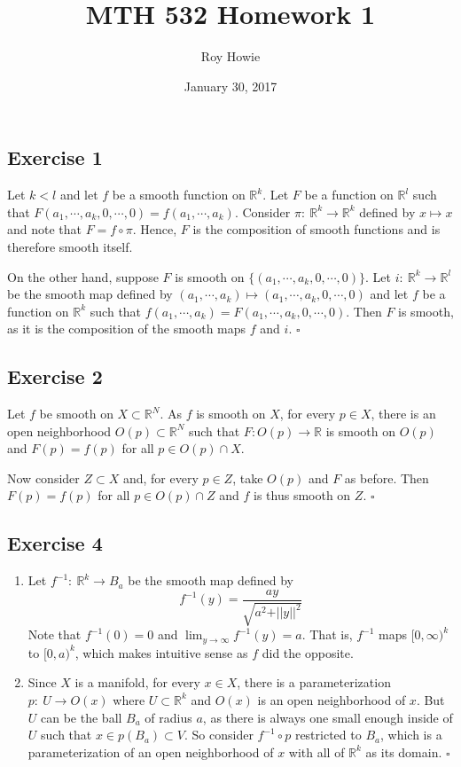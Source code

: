 \documentclass{article}
\newcommand{\R}{\mathbb{R}}
\begin{document}
\title{MTH 532 Homework 1}
\author{Roy Howie}
\date{January 30, 2017}
\maketitle

\subsection*{Exercise 1}
  Let $k < l$ and let $f$ be a smooth function on $\R^k$. Let $F$ be a function
  on $\R^l$ such that $F(a_1,\cdots,a_k,0,\cdots,0)=f(a_1,\cdots,a_k)$. Consider
  $\pi \colon \ \R^k \to \R^k$ defined by $x \mapsto x$ and note that $F=f\circ
  \pi$. Hence, $F$ is the composition of smooth functions and is therefore
  smooth itself.

  On the other hand, suppose $F$ is smooth on $\{(a_1,\cdots,a_k,0,\cdots,0)\}$.
  Let $i \colon \ \R^k \to \R^l$ be the smooth map defined by $(a_1,\cdots,a_k)
  \mapsto (a_1,\cdots,a_k,0,\cdots,0)$ and let $f$ be a function on $\R^k$ such
  that $f(a_1,\cdots,a_k)=F(a_1,\cdots,a_k,0,\cdots,0)$. Then $F$ is smooth, as
  it is the composition of the smooth maps $f$ and $i$.
  \hfill $\square$

\subsection*{Exercise 2}
  Let $f$ be smooth on $X \subset \R^N$. As $f$ is smooth on $X$, for every $p
  \in X$, there is an open neighborhood $O(p)\subset\R^N$ such that $F\colon
  O(p)\to\R$ is smooth on $O(p)$ and $F(p)=f(p)$ for all $p\in O(p)\cap X$.

  Now consider $Z\subset X$ and, for every $p\in Z$, take $O(p)$ and $F$ as
  before. Then $F(p)=f(p)$ for all $p\in O(p)\cap Z$ and $f$ is thus smooth on
  $Z$.
  \hfill $\square$

\subsection*{Exercise 4}
  \begin{enumerate}[label=\textbf{\alph*}]
    \item{
      Let $f^{-1} \colon \ \R^k \to B_a$ be the smooth map defined by
      $$f^{-1}(y) = \frac{ay}{\sqrt{a^2 + \vert\vert y \vert\vert^2}}$$
      Note that $f^{-1}(0)=0$ and $\lim_{y\to \infty}f^{-1}(y)=a$. That is,
      $f^{-1}$ maps $[0,\infty)^k$ to $[0,a)^k$, which makes intuitive sense as
      $f$ did the opposite.
    }
    \item{
      Since $X$ is a manifold, for every $x \in X$, there is a parameterization
      $p\colon\ U\to O(x)$ where $U\subset\R^k$ and $O(x)$ is an open
      neighborhood of $x$. But $U$ can be the ball $B_a$ of radius $a$, as there
      is always one small enough inside of $U$ such that $x\in p(B_a)\subset V$.
      So consider $f^{-1}\circ p$ restricted to $B_a$, which is a
      parameterization of an open neighborhood of $x$ with all of $\R^k$ as its
      domain.
    }
    \hfill $\square$
  \end{enumerate}
\end{document}
